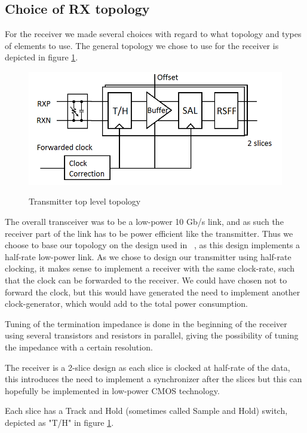 \subsection{Choice of RX topology}

For the receiver we made several choices with regard to what topology and types of elements to use. The general topology we chose to use for the receiver is depicted in figure \ref{fig:topology}.

\begin{figure}[H]
  \centering
  {\includegraphics[scale=0.55]{img/topology_rx.png}}
  \caption{Transmitter top level topology}
  \label{fig:topology}
\end{figure}


The overall transceiver was to be a low-power 10 Gb/s link, and as such the receiver part of the link has to be power efficient like the transmitter. Thus we choose to base our topology on the design used in ~\cite{mahony2010a}, as this design implements a half-rate low-power link. As we chose to design our transmitter using half-rate clocking, it makes sense to implement a receiver with the same clock-rate, such that the clock can be forwarded to the receiver. We could have chosen not to forward the clock, but this would have generated the need to implement another clock-generator, which would add to the total power consumption.


Tuning of the termination impedance is done in the beginning of the receiver using several transistors and resistors in parallel, giving the possibility of tuning the impedance with a certain resolution.

The receiver is a 2-slice design as each slice is clocked at half-rate of the data, this introduces the need to implement a synchronizer after the slices but this can hopefully be implemented in low-power CMOS technology.

Each slice has a Track and Hold (sometimes called Sample and Hold) switch, depicted as "T/H" in figure \ref{fig:topology}.

